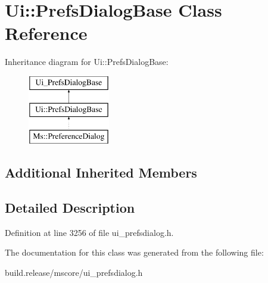 \hypertarget{class_ui_1_1_prefs_dialog_base}{}\section{Ui\+:\+:Prefs\+Dialog\+Base Class Reference}
\label{class_ui_1_1_prefs_dialog_base}
Inheritance diagram for Ui\+:\+:Prefs\+Dialog\+Base\+:\begin{figure}[H]
\begin{center}
\leavevmode
\includegraphics[height=3.000000cm]{class_ui_1_1_prefs_dialog_base}
\end{center}
\end{figure}
\subsection*{Additional Inherited Members}


\subsection{Detailed Description}


Definition at line 3256 of file ui\+\_\+prefsdialog.\+h.



The documentation for this class was generated from the following file\+:\begin{DoxyCompactItemize}
\item 
build.\+release/mscore/ui\+\_\+prefsdialog.\+h\end{DoxyCompactItemize}
